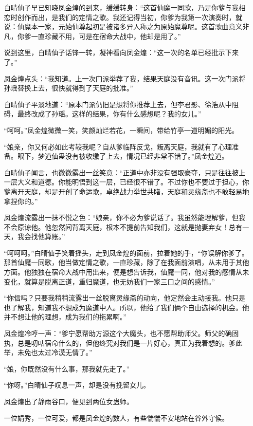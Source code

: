 \begin{this_body}
白晴仙子早已知晓凤金煌的到来，缓缓转身：“这首仙魔一同歌，乃是你爹与我相恋时创作而出，是我们的定情之歌。我还记得当初，你爹为我第一次演奏时，就说：仙魔本一家，元始仙尊起初是被诸多异人称之为原始魔尊呢。这首歌曲意义非凡，你爹一直珍藏不用，可是在宿命大战中，他却是用了。”

说到这里，白晴仙子话锋一转，凝神看向凤金煌：“这一次的名单已经批示下来了。”

凤金煌点头：“我知道。上一次门派举荐了我，结果天庭没有音讯。这一次门派将孙瑶替换上去，很快就得到了天庭的批准。”

白晴仙子平淡地道：“原本门派仍旧是想将你推荐上去，但李君影、徐浩从中阻碍，最终改成了孙瑶。这样的结果，你有什么感想呢？我的女儿。”

“呵呵。”凤金煌微微一笑，笑颜灿烂若花，一瞬间，带给竹亭一道明媚的阳光。

“娘亲，你又何必如此考较我呢？自从爹临阵反戈，叛离天庭，我就有了心理准备。眼下，梦道仙蛊没有被收缴了上去，情况已经非常不错了。”凤金煌道。

白晴仙子闻言，也微微露出一丝笑意：“正道中亦非没有强取豪夺，只是往往披上一层大义和道德。你能明悟到这一层，已经很不错了。不过你也不要过于担心，你爹离开天庭，却是开创了命运歌，卓绝战力举世共睹，天庭和灵缘斋也不敢轻易地拿捏你的。”

凤金煌流露出一抹不悦之色：“娘亲，你不必为爹说话了。我虽然能理解爹，但我不会原谅他。他忽然间背离天庭，根本不提前告知我们，这就是抛妻弃女！总有一天，我会找他算账。”

“呵呵呵。”白晴仙子笑着摇头，走到凤金煌的面前，拉着她的手，“你误解你爹了。那首仙魔一同歌，他当做定情之歌，一直珍藏，除了在我面前演唱，从未用于其他方面。他独独在宿命大战中用出来，便是想告诉我，仙魔一同，他对我的感情从未变化，就算是脱离正道，重归魔道，也无妨我们一家三口之间的感情。”

“你信吗？只要我稍稍流露出一丝脱离灵缘斋的动向，他定然会主动接我。他只是也了解我，知道我不想成为魔道中人。所以，他给了我们俩个自由选择的机会。他并不想让他的理想，成为我们的拖累啊。”

凤金煌冷哼一声：“爹宁愿帮助方源这个大魔头，也不愿帮助师父。师父的确固执，总是叨咕宿命什么的，但他终究对我们是一片好心，真正为我着想的。爹此举，未免也太过冷漠无情了。”

“娘，你既然没有什么事，那我就先走了。”

“你呀。”白晴仙子叹息一声，却是没有挽留女儿。

凤金煌出了静雨谷口，便见到两位女蛊师。

一位娟秀，一位可爱，都是凤金煌的数人，有些惴惴不安地站在谷外守候。


\end{this_body}
